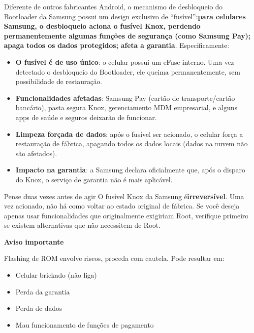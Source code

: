
Diferente de outros fabricantes Android, o mecanismo de desbloqueio do Bootloader da Samsung possui um design exclusivo de “fusível”:\textbf{para celulares Samsung, o desbloqueio aciona o fusível Knox, perdendo permanentemente algumas funções de segurança (como Samsung Pay); apaga todos os dados protegidos; afeta a garantia}. Especificamente:

\begin{itemize}
  \item \textbf{O fusível é de uso único}: o celular possui um eFuse interno. Uma vez detectado o desbloqueio do Bootloader, ele queima permanentemente, sem possibilidade de restauração.
  \item \textbf{Funcionalidades afetadas}: Samsung Pay (cartão de transporte/cartão bancário), pasta segura Knox, gerenciamento MDM empresarial, e alguns apps de saúde e seguros deixarão de funcionar.
  \item \textbf{Limpeza forçada de dados}: após o fusível ser acionado, o celular força a restauração de fábrica, apagando todos os dados locais (dados na nuvem não são afetados).
  \item \textbf{Impacto na garantia}: a Samsung declara oficialmente que, após o disparo do Knox, o serviço de garantia não é mais aplicável.
\end{itemize}

\begin{tcbwarn}{Pense duas vezes antes de agir}
O fusível Knox da Samsung é\textbf{irreversível}. Uma vez acionado, não há como voltar ao estado original de fábrica. Se você deseja apenas usar funcionalidades que originalmente exigiriam Root, verifique primeiro se existem alternativas que não necessitem de Root.

\end{tcbwarn}

\textbf{Aviso importante}\par

Flashing de ROM envolve riscos, proceda com cautela. Pode resultar em:

\begin{itemize}
  \item Celular brickado (não liga)
  \item Perda da garantia
  \item Perda de dados
  \item Mau funcionamento de funções de pagamento
\end{itemize}

